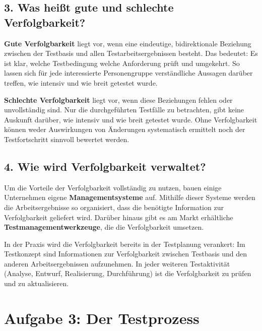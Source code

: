 \documentclass[
	fontsize=12pt,          %
	paper=a4,               %
	numbers=noenddot,       %
	listof=totoc,           %
	listof=entryprefix,     %
	listof=nochaptergap,    %
	bibliography=totoc,     %
	parskip=half,           %
	openany                 %
]{scrbook}
\begin{document}
\section*{3. Was heißt gute und schlechte Verfolgbarkeit?}

\textbf{Gute Verfolgbarkeit} liegt vor, wenn eine eindeutige, bidirektionale Beziehung zwischen der Testbasis und allen Testarbeitsergebnissen besteht.
Das bedeutet: Es ist klar, welche Testbedingung welche Anforderung prüft und umgekehrt.
So lassen sich für jede interessierte Personengruppe verständliche Aussagen darüber treffen, wie intensiv und wie breit getestet wurde.

\textbf{Schlechte Verfolgbarkeit} liegt vor, wenn diese Beziehungen fehlen oder unvollständig sind.
Nur die durchgeführten Testfälle zu betrachten, gibt keine Auskunft darüber, wie intensiv und wie breit getestet wurde.
Ohne Verfolgbarkeit können weder Auswirkungen von Änderungen systematisch ermittelt noch der Testfortschritt sinnvoll bewertet werden.


\section*{4. Wie wird Verfolgbarkeit verwaltet?}

Um die Vorteile der Verfolgbarkeit vollständig zu nutzen, bauen einige Unternehmen eigene \textbf{Managementsysteme} auf.
Mithilfe dieser Systeme werden die Arbeitsergebnisse so organisiert, dass die benötigte Information zur Verfolgbarkeit geliefert wird.
Darüber hinaus gibt es am Markt erhältliche \textbf{Testmanagementwerkzeuge}, die die Verfolgbarkeit umsetzen.

In der Praxis wird die Verfolgbarkeit bereits in der Testplanung verankert: Im Testkonzept sind Informationen zur Verfolgbarkeit zwischen Testbasis und den anderen Arbeitsergebnissen aufzunehmen.
In jeder weiteren Testaktivität (Analyse, Entwurf, Realisierung, Durchführung) ist die Verfolgbarkeit zu prüfen und zu aktualisieren.


\chapter*{Aufgabe 3: Der Testprozess}
\end{document}
